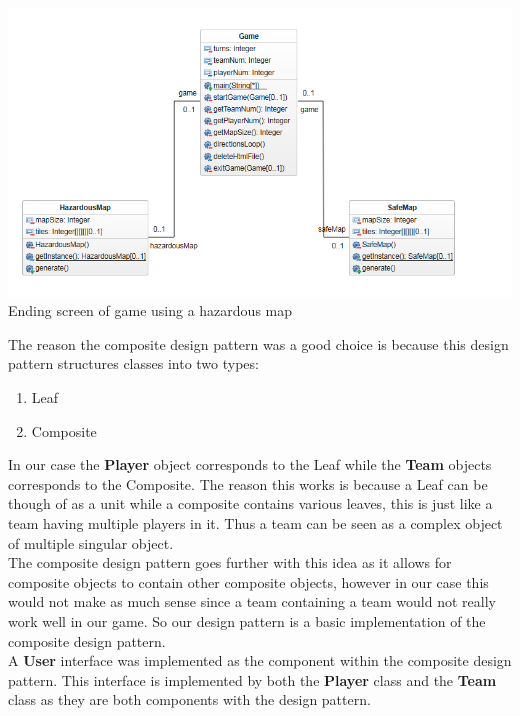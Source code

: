 \documentclass[a4paper,12pt]{extarticle}
\begin{document}
\begin{center}
\includegraphics[scale=0.5]{Enhancement2CD.png}\\
Ending screen of game using a hazardous map
\end{center}

\noindent The reason the composite design pattern was a good choice is because this design pattern structures classes into two types:

\begin{enumerate}
\item Leaf
\item Composite
\end{enumerate}

\noindent In our case the \textbf{Player} object corresponds to the Leaf while the \textbf{Team} objects  corresponds to the Composite. The reason this works is because a Leaf can be though of as a unit while a composite contains various leaves, this is just like a team having multiple players in it. Thus a team can be seen as a complex object of multiple singular object.\\

\noindent The composite design pattern goes further with this idea as it allows for composite objects to contain other composite objects, however in our case this would not make as much sense since a team containing a team would not really work well in our game. So our design pattern is a basic implementation of the composite design pattern.\\

\noindent A \textbf{User} interface was implemented as the component within the composite design pattern. This interface is implemented by both the \textbf{Player} class and the \textbf{Team} class as they are both components with the design pattern.\\
\end{document}
